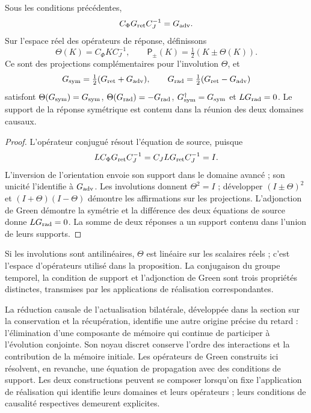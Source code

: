 \begin{proposition}
\label{x_reciprocidad:vii:prop:green-paridades}
Sous les conditions précédentes,
\[
 C_\Phi G_{\rm ret}C_J^{-1}=G_{\rm adv}.
\]
Sur l'espace réel des opérateurs de réponse, définissons
\[
 \Theta(K)=C_\Phi K C_J^{-1},\qquad
 \mathsf P_\pm(K)=\tfrac12(K\pm\Theta(K)).
\]
Ce sont des projections complémentaires pour l'involution \(\Theta\), et
\begin{equation}
 G_{\rm sym}=\tfrac12(G_{\rm ret}+G_{\rm adv}),\qquad
 G_{\rm rad}=\tfrac12(G_{\rm ret}-G_{\rm adv})
 \label{x_reciprocidad:vii:eq:descomposicion-green}
\end{equation}
satisfont \(\Theta(G_{\rm sym})=G_{\rm sym}\),
\(\Theta(G_{\rm rad})=-G_{\rm rad}\),
\(G_{\rm sym}^{\dagger}=G_{\rm sym}\) et
\(LG_{\rm rad}=0\). Le support de la réponse symétrique est contenu
dans la réunion des deux domaines causaux.
\end{proposition}
\begin{proof}
L'opérateur conjugué résout l'équation de source, puisque
\[
 LC_\Phi G_{\rm ret}C_J^{-1}=C_JLG_{\rm ret}C_J^{-1}=I.
\]
L'inversion de l'orientation envoie son support dans le domaine avancé ;
son unicité l'identifie à \(G_{\rm adv}\). Les involutions donnent
\(\Theta^2=I\) ; développer \((I\pm\Theta)^2\) et
\((I+\Theta)(I-\Theta)\) démontre les affirmations sur les projections.
L'adjonction de Green démontre la symétrie et la différence des deux
équations de source donne \(LG_{\rm rad}=0\). La somme de deux réponses
a un support contenu dans l'union de leurs supports.
\end{proof}

Si les involutions sont antilinéaires, \(\Theta\) est linéaire sur les scalaires réels ; c'est l'espace d'opérateurs utilisé dans la proposition. La conjugaison du groupe temporel, la condition de support et l'adjonction de Green sont trois propriétés distinctes, transmises par les applications de réalisation correspondantes.

La réduction causale de l’actualisation bilatérale, développée dans la
section sur la conservation et la récupération, identifie une autre origine précise
du retard : l’élimination d’une composante de mémoire qui continue de
participer à l’évolution conjointe. Son noyau discret conserve
l’ordre des interactions et la contribution de la mémoire initiale.
Les opérateurs de Green construits ici résolvent, en revanche, une
équation de propagation avec des conditions de support. Les deux constructions
peuvent se composer lorsqu’on fixe l’application de réalisation qui identifie
leurs domaines et leurs opérateurs ; leurs conditions de causalité respectives
demeurent explicites.

